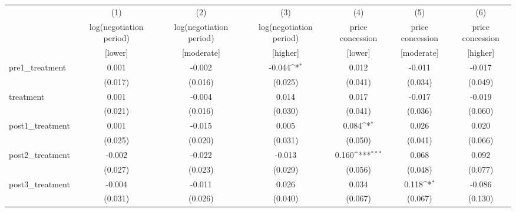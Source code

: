 {
\def\sym#1{\ifmmode^{#1}\else\(^{#1}\)\fi}
\begin{adjustbox}{max width=\textwidth}
\begin{tabular}{l*{6}{c}}
\toprule
            &\multicolumn{1}{c}{(1)}&\multicolumn{1}{c}{(2)}&\multicolumn{1}{c}{(3)}&\multicolumn{1}{c}{(4)}&\multicolumn{1}{c}{(5)}&\multicolumn{1}{c}{(6)}\\
            &\multicolumn{1}{c}{log(negotiation period)}&\multicolumn{1}{c}{log(negotiation period)}&\multicolumn{1}{c}{log(negotiation period)}&\multicolumn{1}{c}{price concession}&\multicolumn{1}{c}{price concession}&\multicolumn{1}{c}{price concession}\\
            &[lower]&[moderate]&[higher]&[lower]&[moderate]&[higher]\\
\midrule
pre1\_treatment&       0.001         &      -0.002         &      -0.044\sym{*}  &       0.012         &      -0.011         &      -0.017         \\
            &     (0.017)         &     (0.016)         &     (0.025)         &     (0.041)         &     (0.034)         &     (0.049)         \\
\addlinespace
treatment   &       0.001         &      -0.004         &       0.014         &       0.017         &      -0.017         &      -0.019         \\
            &     (0.021)         &     (0.016)         &     (0.030)         &     (0.041)         &     (0.036)         &     (0.060)         \\
\addlinespace
post1\_treatment&       0.001         &      -0.015         &       0.005         &       0.084\sym{*}  &       0.026         &       0.020         \\
            &     (0.025)         &     (0.020)         &     (0.031)         &     (0.050)         &     (0.041)         &     (0.066)         \\
\addlinespace
post2\_treatment&      -0.002         &      -0.022         &      -0.013         &       0.160\sym{***}&       0.068         &       0.092         \\
            &     (0.027)         &     (0.023)         &     (0.029)         &     (0.056)         &     (0.048)         &     (0.077)         \\
\addlinespace
post3\_treatment&      -0.004         &      -0.011         &       0.026         &       0.034         &       0.118\sym{*}  &      -0.086         \\
            &     (0.031)         &     (0.026)         &     (0.040)         &     (0.067)         &     (0.067)         &     (0.130)         \\

\end{tabular}
\end{adjustbox}}
